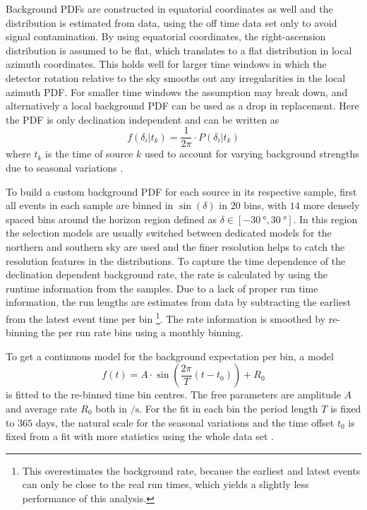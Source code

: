 Background PDFs are constructed in equatorial coordinates as well and the distribution is estimated from data, using the off time data set only to avoid signal contamination.
By using equatorial coordinates, the right-ascension distribution is assumed to be flat, which translates to a flat distribution in local azimuth coordinates.
This holds well for larger time windows in which the detector rotation relative to the sky smooths out any irregularities in the local azimuth PDF.
For smaller time windows the assumption may break down, and alternatively a local background PDF can be used as a drop in replacement.
Here the PDF is only declination independent and can be written as
\begin{equation}
  f(\delta_i|t_k) = \frac{1}{2\pi}\cdot P(\delta_i|t_k)
\end{equation}
where $t_k$ is the time of source $k$ used to account for varying background strengths due to seasonal variations .

To build a custom background PDF for each source in its respective sample, first all events in each sample are binned in $\sin(\delta)$ in $20$ bins, with $14$ more densely spaced bins around the horizon region defined as $\delta\in[\SI{-30}{\degree}, \SI{30}{\degree}]$.
In this region the selection models are usually switched between dedicated models for the northern and southern sky are used and the finer resolution helps to catch the resolution features in the distributions.
To capture the time dependence of the declination dependent background rate, the rate is calculated by using the runtime information from the samples.
Due to a lack of proper run time information, the run lengths are estimates from data by subtracting the earliest from the latest event time per bin \footnote{This overestimates the background rate, because the earliest and latest events can only be close to the real run times, which yields a slightly less performance of this analysis.}.
The rate information is smoothed by re-binning the per run rate bins using a monthly binning.

To get a continuous model for the background expectation per bin, a model
\begin{equation}
  f(t)
  = A\cdot
    \sin\left(\frac{2\pi}{T}\left(t - t_0\right)\right) + R_0
\end{equation}
is fitted to the re-binned time bin centres.
The free parameters are amplitude $A$ and average rate $R_0$ both in $\si{\per\s}$.
For the fit in each bin the period length $T$ is fixed to $365$ days, the natural scale for the seasonal variations and the time offset $t_0$ is fixed from a fit with more statistics using the whole data set .

